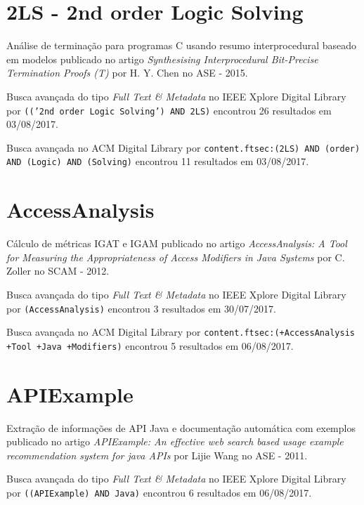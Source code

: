 

\label{softwares-summary}

\section{2LS - 2nd order Logic Solving}

Análise de terminação para programas C usando resumo interprocedural baseado em modelos
publicado no artigo
{\it Synthesising Interprocedural Bit-Precise Termination Proofs (T)}
por
H. Y. Chen
no
ASE
-
2015.

Busca avançada do tipo {\it Full Text \& Metadata} no IEEE Xplore Digital Library por
\texttt{(('2nd order Logic Solving') AND 2LS)}
encontrou
26 resultados em
03/08/2017.

Busca avançada no ACM Digital Library por
\texttt{content.ftsec:(2LS) AND (order) AND (Logic) AND (Solving)}
encontrou
11 resultados em
03/08/2017.

\section{AccessAnalysis}

Cálculo de métricas IGAT e IGAM
publicado no artigo
{\it AccessAnalysis: A Tool for Measuring the Appropriateness of Access Modifiers in Java Systems}
por
C. Zoller
no
SCAM
-
2012.

Busca avançada do tipo {\it Full Text \& Metadata} no IEEE Xplore Digital Library por
\texttt{(AccessAnalysis)}
encontrou
3 resultados em
30/07/2017.

Busca avançada no ACM Digital Library por
\texttt{content.ftsec:(+AccessAnalysis +Tool +Java +Modifiers)}
encontrou
5 resultados em
06/08/2017.

\section{APIExample}

Extração de informações de API Java e documentação automática com exemplos
publicado no artigo
{\it APIExample: An effective web search based usage example recommendation system for java APIs}
por
Lijie Wang
no
ASE
-
2011.

Busca avançada do tipo {\it Full Text \& Metadata} no IEEE Xplore Digital Library por
\texttt{((APIExample) AND Java)}
encontrou
6 resultados em
06/08/2017.

